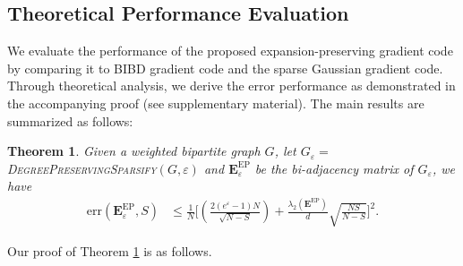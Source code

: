 \documentclass[lettersize,journal]{IEEEtran}
\newcommand{\err}[1]{\mathrm{err}(#1, S)}
\newcommand{\GEP}{\boldsymbol{E}^{\mathrm{EP}}}
\newtheorem{theorem}{Theorem}
\newcommand{\lele}{\textcolor{cyan}}
\begin{document}
\subsection{Theoretical Performance Evaluation}
\label{sec:performance-evalution}

We evaluate the performance of the proposed expansion-preserving gradient code by comparing it to BIBD gradient code and the sparse Gaussian gradient code. Through theoretical analysis, we derive the error performance as demonstrated in the accompanying proof (see supplementary material). The main results are summarized as follows:

\begin{theorem}
\label{thm:EP-GC-error-performance}
Given a weighted bipartite graph $G$, let $G_\varepsilon = $ \textsc{DegreePreservingSparsify}$(G, \varepsilon)$ and $\GEP_\varepsilon$ be the bi-adjacency matrix of $G_\varepsilon$, we have
\begin{align}
         \err{\GEP_\varepsilon} &\leq \tfrac{1}{N}\bigg[  \left(\tfrac{2(e^{\varepsilon}-1)N}{\sqrt{N-S}}\right)+\tfrac{\lambda_2(\GEP)}{d} \sqrt{\tfrac{NS}{N-S}}\bigg]^2
            \label{eq:error-upperbound-by-the-second-largest-lambda}.
\end{align}
\end{theorem}
Our proof of Theorem \ref{thm:EP-GC-error-performance} is as follows.
\end{document}
